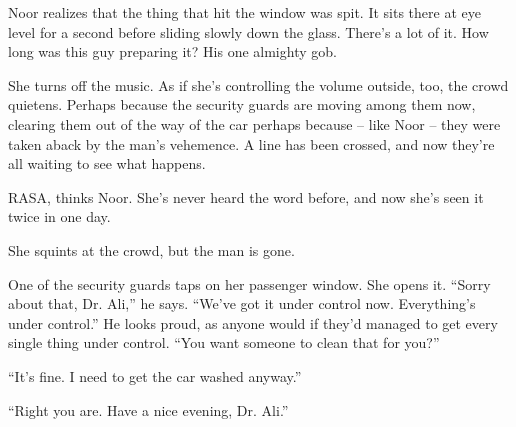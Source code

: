 \documentclass[12pt,a5paper]{book}
\newcommand{\qm}[1]{“#1”}
\begin{document}
Noor realizes that the thing that hit the window was spit. It sits there at eye level for a second before sliding slowly down the glass. There's a lot of it. How long was this guy preparing it? His one almighty gob.

She turns off the music. As if she's controlling the volume outside, too, the crowd quietens. Perhaps because the security guards are moving among them now, clearing them out of the way of the car perhaps because – like Noor – they were taken aback by the man's vehemence. A line has been crossed, and now they're all waiting to see what happens.

RASA, thinks Noor. She's never heard the word before, and now she's seen it twice in one day.

She squints at the crowd, but the man is gone.

One of the security guards taps on her passenger window. She opens it. \qm{Sorry about that, Dr. Ali,} he says. \qm{We've got it under control now. Everything's under control.} He looks proud, as anyone would if they'd managed to get every single thing under control. \qm{You want someone to clean that for you?}

\qm{It's fine. I need to get the car washed anyway.}

\qm{Right you are. Have a nice evening, Dr. Ali.}
\end{document}
